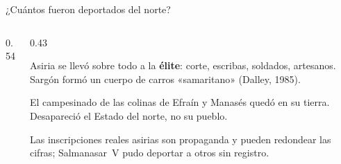 \documentclass[hyperref={bookmarks=false},aspectratio=169]{beamer}
\begin{document}
\begin{frame}{¿Cuántos fueron deportados del norte?}
\begin{columns}[T,onlytextwidth]
\begin{column}{0.54\textwidth}
\end{column}
\begin{column}{0.43\textwidth}\footnotesize
\begin{clave}\footnotesize Asiria se llevó sobre todo a la \textbf{élite}: corte, escribas, soldados, artesanos. Sargón formó un cuerpo de carros «samaritano» (Dalley, 1985).\end{clave}
\begin{clave}\footnotesize El campesinado de las colinas de Efraín y Manasés quedó en su tierra. Desapareció el Estado del norte, no su pueblo.\end{clave}
\begin{notalam}[Precisión]
Las inscripciones reales asirias son propaganda y pueden redondear las cifras; Salmanasar~V pudo deportar a otros sin registro.
\end{notalam}
\end{column}
\end{columns}
\end{frame}
\end{document}
